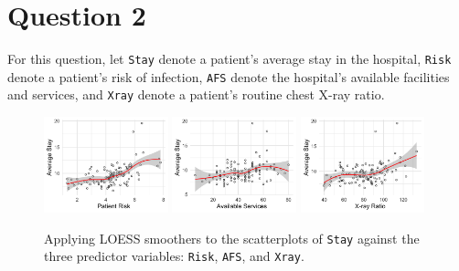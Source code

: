 \documentclass[10pt]{article}
\begin{document}
\begin{itemize}
\end{itemize}

\section{Question 2} \noindent
For this question, let \texttt{Stay} denote a patient's average stay in the hospital, \texttt{Risk} denote a patient's risk of infection, \texttt{AFS} 
denote the hospital's available facilities and services, and \texttt{Xray} denote a patient's routine chest X-ray ratio. 
\begin{figure}[ht]
    \includegraphics[width = 0.32\textwidth]{q02_loess1.png}
    \includegraphics[width = 0.32\textwidth]{q02_loess2.png}
    \includegraphics[width = 0.32\textwidth]{q02_loess3.png}
    \caption{Applying LOESS smoothers to the scatterplots of \texttt{Stay} against the three predictor variables: \texttt{Risk}, \texttt{AFS}, and 
    \texttt{Xray}.}
    \label{q02_fig01}
\end{figure}
\end{document}
